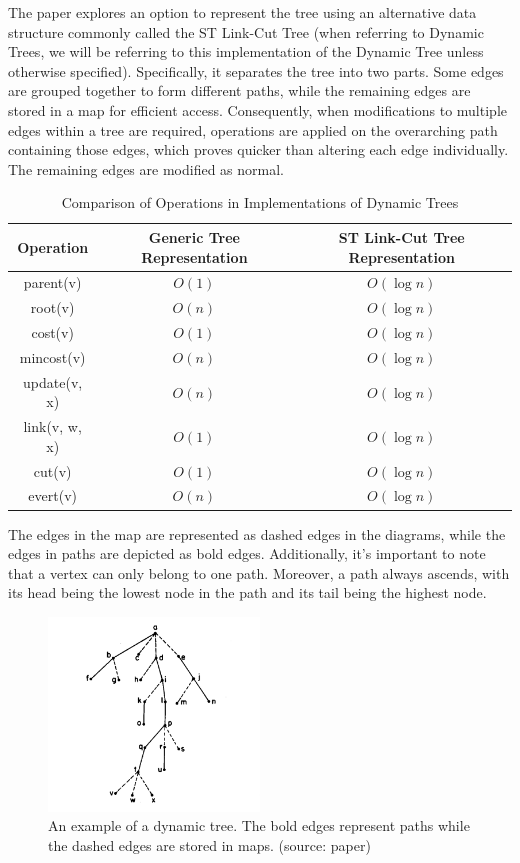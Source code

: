 \documentclass[a4paper, 11pt]{article}
\begin{document}
The paper explores an option to represent the tree using an alternative data structure commonly called the ST Link-Cut Tree (when referring to Dynamic Trees, we will be referring to this implementation of the Dynamic Tree unless otherwise specified). Specifically, it separates the tree into two parts. Some edges are grouped together to form different paths, while the remaining edges are stored in a map for efficient access. Consequently, when modifications to multiple edges within a tree are required, operations are applied on the overarching path containing those edges, which proves quicker than altering each edge individually. The remaining edges are modified as normal.

\begin{table}[h]
\centering
\caption{Comparison of Operations in Implementations of Dynamic Trees}
\label{table:comparison}
\begin{tabular}{|c|c|c|}
\hline
\textbf{Operation} & \textbf{Generic Tree Representation} & \textbf{ST Link-Cut Tree Representation} \\
\hline
parent(v) & $O(1)$ & $O(\log n)$ \\
\hline
root(v) & $O(n)$ & $O(\log n)$ \\
\hline
cost(v) & $O(1)$ & $O(\log n)$ \\
\hline
mincost(v) & $O(n)$ & $O(\log n)$ \\
\hline
update(v, x) & $O(n)$ & $O(\log n)$ \\
\hline
link(v, w, x) & $O(1)$ & $O(\log n)$ \\
\hline
cut(v) & $O(1)$ & $O(\log n)$ \\
\hline
evert(v) & $O(n)$ & $O(\log n)$ \\
\hline
\end{tabular}
\end{table}

The edges in the map are represented as dashed edges in the diagrams, while the edges in paths are depicted as bold edges. Additionally, it's important to note that a vertex can only belong to one path. Moreover, a path always ascends, with its head being the lowest node in the path and its tail being the highest node.

\begin{figure}
    \centering
    \includegraphics[width=0.5\textwidth]{img/diagrams/dyn_tree.png}
    \caption{An example of a dynamic tree. The bold edges represent paths while the dashed edges are stored in maps. (source: paper)}
    \label{fig:1}
\end{figure}
\end{document}

